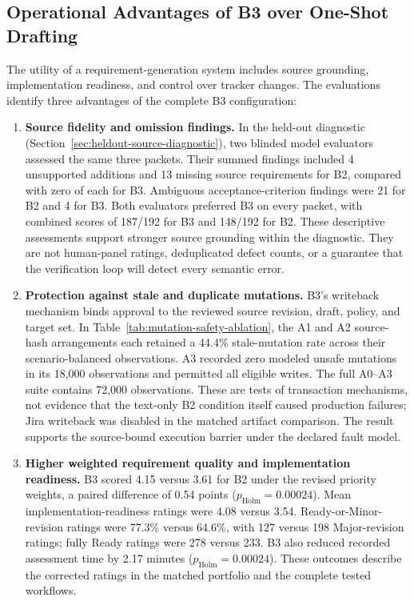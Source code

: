 \documentclass[pdflatex,sn-basic]{sn-jnl}
\begin{document}
\subsection{Operational Advantages of B3 over One-Shot Drafting}
The utility of a requirement-generation system includes source grounding, implementation readiness, and control over tracker changes. The evaluations identify three advantages of the complete B3 configuration:
\begin{enumerate}
  \item \textbf{Source fidelity and omission findings.} In the held-out diagnostic (Section~\ref{sec:heldout-source-diagnostic}), two blinded model evaluators assessed the same three packets. Their summed findings included 4 unsupported additions and 13 missing source requirements for B2, compared with zero of each for B3. Ambiguous acceptance-criterion findings were 21 for B2 and 4 for B3. Both evaluators preferred B3 on every packet, with combined scores of 187/192 for B3 and 148/192 for B2. These descriptive assessments support stronger source grounding within the diagnostic. They are not human-panel ratings, deduplicated defect counts, or a guarantee that the verification loop will detect every semantic error.
  \item \textbf{Protection against stale and duplicate mutations.} B3's writeback mechanism binds approval to the reviewed source revision, draft, policy, and target set. In Table~\ref{tab:mutation-safety-ablation}, the A1 and A2 source-hash arrangements each retained a 44.4\% stale-mutation rate across their scenario-balanced observations. A3 recorded zero modeled unsafe mutations in its 18,000 observations and permitted all eligible writes. The full A0--A3 suite contains 72,000 observations. These are tests of transaction mechanisms, not evidence that the text-only B2 condition itself caused production failures; Jira writeback was disabled in the matched artifact comparison. The result supports the source-bound execution barrier under the declared fault model.
  \item \textbf{Higher weighted requirement quality and implementation readiness.} B3 scored 4.15 versus 3.61 for B2 under the revised priority weights, a paired difference of 0.54 points ($p_{\mathrm{Holm}}=0.00024$). Mean implementation-readiness ratings were 4.08 versus 3.54. Ready-or-Minor-revision ratings were 77.3\% versus 64.6\%, with 127 versus 198 Major-revision ratings; fully Ready ratings were 278 versus 233. B3 also reduced recorded assessment time by 2.17 minutes ($p_{\mathrm{Holm}}=0.00024$). These outcomes describe the corrected ratings in the matched portfolio and the complete tested workflows.
\end{enumerate}
\end{document}
